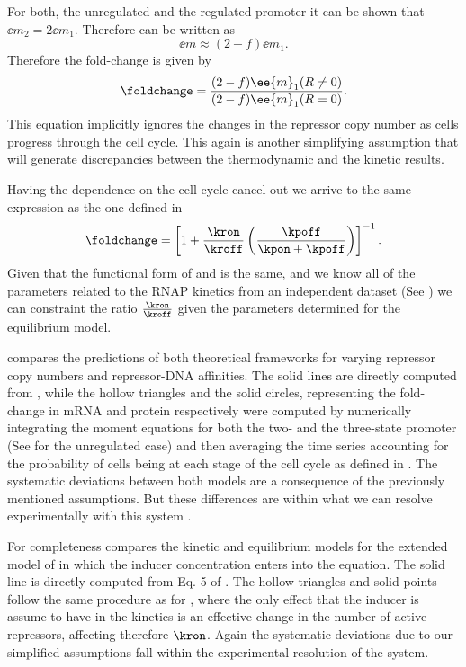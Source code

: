 For both, the unregulated and the regulated promoter it can be shown that
$\ee{m}_2 = 2 \ee{m}_1$. Therefore  can be written
as
\begin{equation}
  \ee{m} \approx (2 - f) \ee{m}_1.
\end{equation}
Therefore the fold-change is given by
\begin{equation}
  \foldchange = {(2 - f) \ee{m}_1(R \neq 0) \over (2 - f) \ee{m}_1(R = 0)}.
\end{equation}
This equation implicitly ignores the changes in the repressor copy number as
cells progress through the cell cycle. This again is another simplifying
assumption that will generate discrepancies between the thermodynamic and the
kinetic results.

Having the dependence on the cell cycle cancel out we arrive to the same
expression as the one defined in 
\begin{equation}
  \foldchange = \left[ 1 + {\kron \over \kroff}
                \left( {\kpoff \over \kpon + \kpoff} \right)\right]^{-1}.
  \label{eq_fold_change_kinetic}
\end{equation}
Given that the functional form of  and
 is the same, and we know all of the parameters
related to the RNAP kinetics from an independent dataset (See ) we can constraint the ratio ${\kron \over
\kroff}$ given the parameters determined for the equilibrium model.

 compares the predictions of both theoretical
frameworks for varying repressor copy numbers and repressor-DNA affinities. The
solid lines are directly computed from , while the
hollow triangles and the solid circles, representing the fold-change in mRNA and
protein respectively were computed by numerically integrating the moment
equations for both the two- and the three-state promoter (See
 for the unregulated case) and then averaging the
time series accounting for the probability of cells being at each stage of the
cell cycle as defined in . The systematic deviations between
both models are a consequence of the previously mentioned assumptions. But these
differences are within what we can resolve experimentally with this system
\cite{Garcia2011c, Brewster2014, Barnes2018, Razo-Mejia2018}.

For completeness  compares the kinetic and equilibrium
models for the extended model of \cite{Razo-Mejia2018} in which the inducer
concentration enters into the equation. The solid line is directly computed from
Eq. 5 of \cite{Razo-Mejia2018}. The hollow triangles and solid points follow the
same procedure as for , where the only effect that the
inducer is assume to have in the kinetics is an effective change in the number
of active repressors, affecting therefore $\kron$. Again the systematic
deviations due to our simplified assumptions fall within the experimental
resolution of the system.

